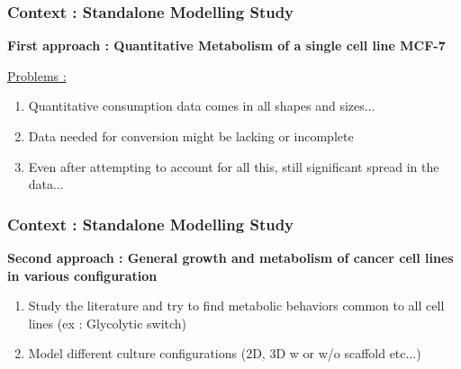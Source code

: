 \documentclass{beamer}
\begin{document}
\begin{frame}
	\frametitle{Context : Standalone Modelling Study}
	
	\textbf{First approach : Quantitative Metabolism of a single cell line \textbf{MCF-7}
	}
	
	\vspace{1cm}
	\underline{Problems :}
	\begin{enumerate}
		\item Quantitative consumption data comes in all shapes and sizes...
		\item Data needed for conversion might be lacking or incomplete
		\item Even after attempting to account for all this, still significant spread in the data... 
	\end{enumerate}
	

\end{frame}

\begin{frame}
	\frametitle{Context : Standalone Modelling Study}
	
	\textbf{Second approach : General growth and metabolism of cancer cell lines in various configuration
	}
	
	\vspace{1cm}
	\begin{enumerate}
		\item Study the literature and try to find metabolic behaviors common to all cell lines (ex : Glycolytic switch)
		\item Model different culture configurations (2D, 3D w or w/o scaffold etc...)  
	\end{enumerate}
	

\end{frame}
\end{document}

